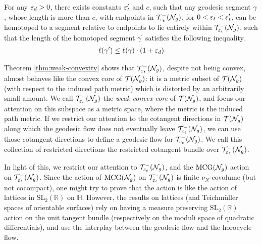 \begingroup
\def\thetheorem{\ref{thm:weak-convexity}}
\begin{theorem}
  For any $\varepsilon_d > 0$, there exists constants $\varepsilon_t^{\prime}$ and $c$, such that any geodesic segment $\gamma$, whose length is more than $c$, with endpoints in $\mathcal{T}_{\varepsilon_t}^{-}(\mathcal{N}_g)$, for $0 < \varepsilon_t < \varepsilon_t^{\prime}$, can be homotoped to a segment relative to endpoints to lie entirely within $\mathcal{T}_{\varepsilon_t}^{-}(\mathcal{N}_g)$, such that the length of the homotoped segment $\gamma^{\prime}$ satisfies the following inequality.
  \begin{align*}
    \ell(\gamma^{\prime}) \leq \ell(\gamma) \cdot (1 + \varepsilon_d)
  \end{align*}
\end{theorem}
\addtocounter{theorem}{-1}
\endgroup

Theorem \ref{thm:weak-convexity} shows that $\mathcal{T}_{\varepsilon_t}^{-}(\mathcal{N}_g)$, despite not being convex, almost behaves like the convex core of $\mathcal{T}(\mathcal{N}_g)$: it is a metric subset of $\mathcal{T}(\mathcal{N}_g)$ (with respect to the induced path metric) which is distorted by an arbitrarily small amount.
We call $\mathcal{T}_{\varepsilon_t}^{-}(\mathcal{N}_g)$ the \emph{weak convex core} of $\mathcal{T}(\mathcal{N}_g)$, and focus our attention on this subspace as a metric space, where the metric is the induced path metric.
If we restrict our attention to the cotangent directions in $\mathcal{T}(\mathcal{N}_g)$ along which the geodesic flow does not eventually leave $\mathcal{T}_{\varepsilon_t}^{-}(\mathcal{N}_g)$, we can use those cotangent directions to define a geodesic flow for $\mathcal{T}_{\varepsilon_t}^{-}(\mathcal{N}_g)$.
We call this collection of restricted directions the restricted cotangent bundle over $\mathcal{T}_{\varepsilon_t}^{-}(\mathcal{N}_g)$.


In light of this, we restrict our attention to $\mathcal{T}_{\varepsilon_t}^{-}(\mathcal{N}_g)$, and the $\mathrm{MCG}(\mathcal{N}_g)$ action on $\mathcal{T}_{\varepsilon_t}^{-}(\mathcal{N}_g)$.
Since the action of $\mathrm{MCG}(\mathcal{N}_g)$ on $\mathcal{T}_{\varepsilon_t}^{-}(\mathcal{N}_g)$ is finite $\nu_N$-covolume (but not cocompact), one might try to prove that the action is
{like}
the action of lattices in $\mathrm{SL}_2(\mathbb{R})$ on $\mathbb{H}$.
However, the results on lattices (and Teichmüller spaces of orientable surfaces) rely on having a measure preserving $\mathrm{SL}_2(\mathbb{R})$ action on the unit tangent bundle (respectively on the moduli space of quadratic differentials), and use the interplay between the geodesic flow and the horocycle flow.

